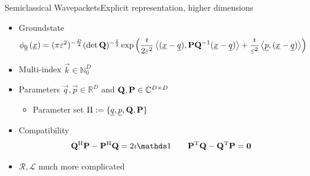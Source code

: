 \documentclass{beamer}
\begin{document}
\begin{frame}{Semiclassical Wavepackets}{Explicit representation, higher dimensions}
  \begin{itemize}
    \item Groundstate
    {\scriptsize
    \begin{align*}
      \phi_{\underline{0}}\left(\underline{x}\right)
      =
      (\pi\varepsilon^2)^{-\frac{D}{4}} (\det\mathbf{Q})^{-\frac{1}{2}}
      \exp \left( \frac{\imath}{2\varepsilon^2}
      \left\langle (\underline{x}-\underline{q}) , \mathbf{P}\mathbf{Q}{}^{-1}(\underline{x}-\underline{q}) \right\rangle
      + \frac{\imath}{\varepsilon^2} \left\langle \underline{p} , (\underline{x}-\underline{q}) \right\rangle
      \right)
    \end{align*}}
    \item Multi-index $\vec{k} \in \mathbb{N}_0^D$
    \item Parameters $\vec{q}, \vec{p} \in \mathbb{R}^D$ and $\mathbf{Q}, \mathbf{P} \in \mathbb{C}^{D \times D}$
    \begin{itemize}
      \item Parameter set $\Pi := \{\underline{q}, \underline{p}, \mathbf{Q}, \mathbf{P}\}$
    \end{itemize}
    \item Compatibility
    \begin{align*}
      \mat{Q}\H \mat{P} - \mat{P}\H \mat{Q} = 2\imath \id
      \qquad
      \mat{P}\T \mat{Q} - \mat{Q}\T \mat{P} = \mat{0}
    \end{align*}
    \item $\mathcal{R}, \mathcal{L}$ much more complicated
  \end{itemize}
\end{frame}
\end{document}
